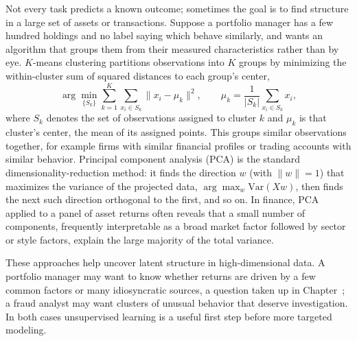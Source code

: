 \documentclass[../ai_in_finance]{subfiles}
\begin{document}
Not every task predicts a known outcome; sometimes the goal is to find structure in a large set of assets or transactions. Suppose a portfolio manager has a few hundred holdings and no label saying which behave similarly, and wants an algorithm that groups them from their measured characteristics rather than by eye. $K$-means clustering partitions observations into $K$ groups by minimizing the within-cluster sum of squared distances to each group's center,
\begin{equation*}
\arg\min_{\{S_k\}} \sum_{k=1}^K \sum_{x_i \in S_k} \|x_i - \mu_k\|^2, \qquad \mu_k = \frac{1}{|S_k|}\sum_{x_i \in S_k} x_i,
\end{equation*}
where $S_k$ denotes the set of observations assigned to cluster $k$ and $\mu_k$ is that cluster's center, the mean of its assigned points. This groups similar observations together, for example firms with similar financial profiles or trading accounts with similar behavior. Principal component analysis (PCA) is the standard dimensionality-reduction method: it finds the direction $w$ (with $\|w\|=1$) that maximizes the variance of the projected data, $\arg\max_w \text{Var}(Xw)$, then finds the next such direction orthogonal to the first, and so on. In finance, PCA applied to a panel of asset returns often reveals that a small number of components, frequently interpretable as a broad market factor followed by sector or style factors, explain the large majority of the total variance.

These approaches help uncover latent structure in high-dimensional data. A portfolio manager may want to know whether returns are driven by a few common factors or many idiosyncratic sources, a question taken up in Chapter~; a fraud analyst may want clusters of unusual behavior that deserve investigation. In both cases unsupervised learning is a useful first step before more targeted modeling.
\end{document}
